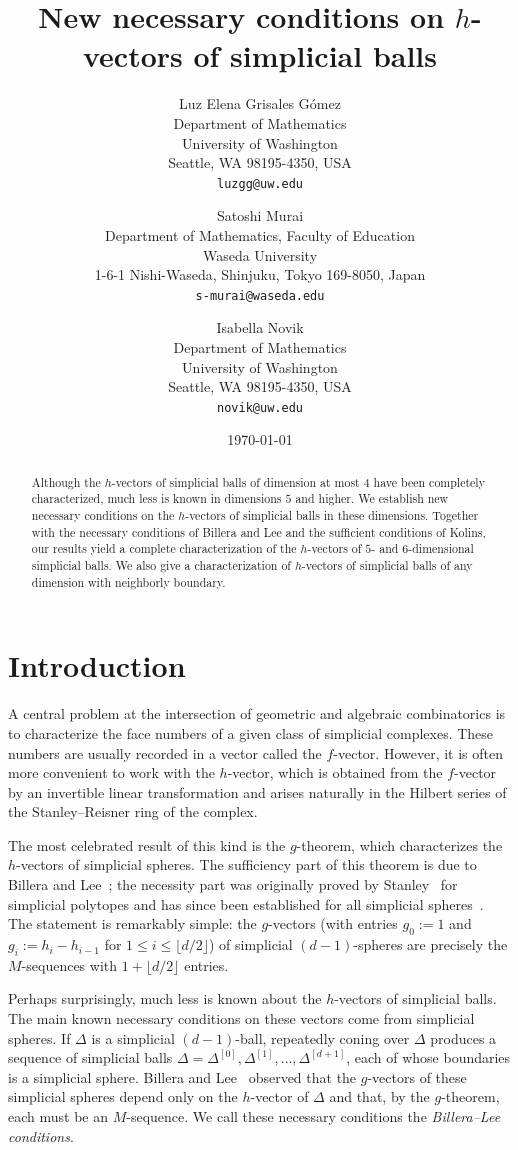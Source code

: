 \documentclass[11pt]{article}
\title{New necessary conditions on $h$-vectors of simplicial balls}
\author{
  Luz Elena Grisales Gómez\\
  Department of Mathematics\\
  University of Washington\\
  Seattle, WA 98195-4350, USA\\
  \texttt{luzgg@uw.edu}
  \and
  Satoshi Murai\\
  Department of Mathematics, Faculty of Education\\
  Waseda University\\
  1-6-1 Nishi-Waseda, Shinjuku, Tokyo 169-8050, Japan\\
  \texttt{s-murai@waseda.edu}
  \and
  Isabella Novik\\
  Department of Mathematics\\
  University of Washington\\
  Seattle, WA 98195-4350, USA\\
  \texttt{novik@uw.edu}
}
\date{\today}
\theoremstyle{definition}
\numberwithin{equation}{theorem}
\begin{document}
\maketitle

\begin{abstract}
    Although the $h$-vectors of simplicial balls of dimension at most $4$ have been completely characterized, much less is known in dimensions $5$ and higher. We establish new necessary conditions on the $h$-vectors of simplicial balls in these dimensions. 
    Together with the necessary conditions of Billera and Lee and the sufficient conditions of Kolins, our results yield a complete characterization of the $h$-vectors of $5$- and $6$-dimensional simplicial balls. We also give a characterization of $h$-vectors of simplicial balls of any dimension with neighborly boundary.
\end{abstract}

\section{Introduction}

A central problem at the intersection of geometric and algebraic combinatorics is to characterize the face numbers of a given class of simplicial complexes. These numbers are usually recorded in a vector called the $f$-vector. However, it is often more convenient to work with the $h$-vector, which is obtained from the $f$-vector by an invertible linear transformation and arises naturally in the Hilbert series of the Stanley--Reisner ring of the complex.

The most celebrated result of this kind is the $g$-theorem, which characterizes the $h$-vectors of simplicial spheres. The sufficiency part of this theorem is due to Billera and Lee~\cite{BilleraLeeProofSufficency1981}; the necessity part was originally proved by Stanley~\cite{Stanley1980} for simplicial polytopes and has since been established for all simplicial spheres~\cite{Adiprasito2018,AdiprasitoPapadakisPetrotou2021,KaruXiao2023,PapadakisPetrotou2020}. The statement is remarkably simple: the $g$-vectors (with entries $g_0 := 1$ and $g_i := h_i - h_{i-1}$ for $1 \leq i \leq \lfloor d/2\rfloor$) of simplicial $(d-1)$-spheres are precisely the $M$-sequences with $1+\lfloor d/2\rfloor$ entries.

Perhaps surprisingly, much less is known about the $h$-vectors of simplicial balls. The main known necessary conditions on these vectors come from simplicial spheres. If $\Delta$ is a simplicial $(d-1)$-ball, repeatedly coning over $\Delta$ produces a sequence of simplicial balls $\Delta = \Delta^{[0]}, \Delta^{[1]}, \dots, \Delta^{[d+1]}$, each of whose boundaries is a simplicial sphere. Billera and Lee~\cite{BilleraLeeNumbersFacesPolytope1981} observed that the $g$-vectors of these simplicial spheres depend only on the $h$-vector of $\Delta$ and that, by the $g$-theorem, each must be an $M$-sequence. We call these necessary conditions the \emph{Billera--Lee conditions}.
\end{document}
